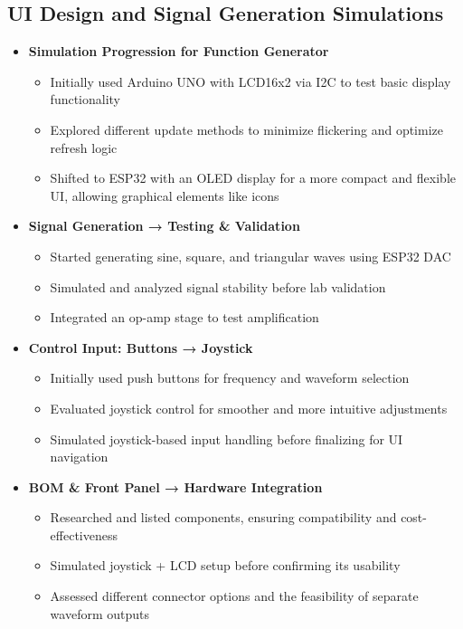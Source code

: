\documentclass[12pt,a4paper]{article}
\begin{document}
\subsection{UI Design and Signal Generation Simulations}
\begin{itemize}
\item \textbf{Simulation Progression for Function Generator}  
 
\begin{itemize}
    \item Initially used Arduino UNO with LCD16x2 via I2C to test basic display functionality
    \item Explored different update methods to minimize flickering and optimize refresh logic
    \item Shifted to ESP32 with an OLED display for a more compact and flexible UI, allowing graphical elements like icons
\end{itemize}

\item \textbf{Signal Generation → Testing \& Validation}  
\begin{itemize}
    \item Started generating sine, square, and triangular waves using ESP32 DAC
    \item Simulated and analyzed signal stability before lab validation
    \item Integrated an op-amp stage to test amplification
\end{itemize}

\item \textbf{Control Input: Buttons → Joystick}  
\begin{itemize}
    \item Initially used push buttons for frequency and waveform selection
    \item Evaluated joystick control for smoother and more intuitive adjustments
    \item Simulated joystick-based input handling before finalizing for UI navigation
\end{itemize}

\item \textbf{BOM \& Front Panel → Hardware Integration}  
\begin{itemize}
    \item Researched and listed components, ensuring compatibility and cost-effectiveness
    \item Simulated joystick + LCD setup before confirming its usability
    \item Assessed different connector options and the feasibility of separate waveform outputs
\end{itemize}
\end{itemize}
\end{document}
